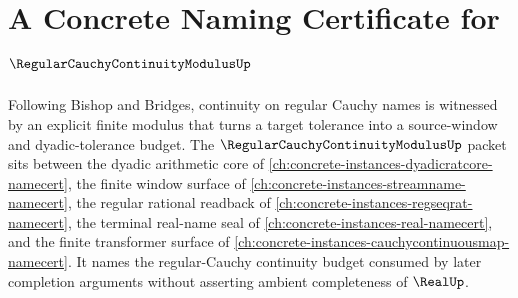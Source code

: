 \chapter{A Concrete Naming Certificate for $\RegularCauchyContinuityModulusUp$}
\label{ch:concrete-instances-regular-cauchy-continuity-modulus-namecert}

Following Bishop and Bridges, continuity on regular Cauchy names is witnessed by an explicit finite modulus that turns a target tolerance into a source-window and dyadic-tolerance budget. The $\RegularCauchyContinuityModulusUp$ packet sits between the dyadic arithmetic core of \autoref{ch:concrete-instances-dyadicratcore-namecert}, the finite window surface of \autoref{ch:concrete-instances-streamname-namecert}, the regular rational readback of \autoref{ch:concrete-instances-regseqrat-namecert}, the terminal real-name seal of \autoref{ch:concrete-instances-real-namecert}, and the finite transformer surface of \autoref{ch:concrete-instances-cauchycontinuousmap-namecert}. It names the regular-Cauchy continuity budget consumed by later completion arguments without asserting ambient completeness of $\RealUp$.

